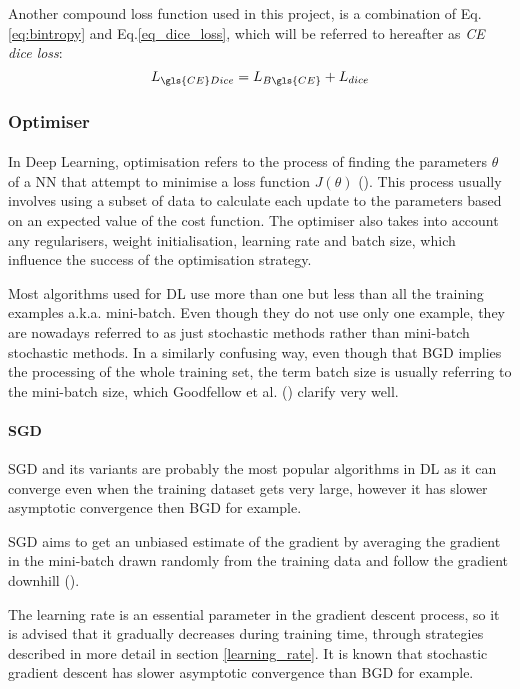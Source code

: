 Another compound loss function used in this project, is a combination of Eq.\ref{eq:bintropy} and Eq.\ref{eq_dice_loss}, which will be referred to hereafter as \textit{\gls{CE} dice loss}:
\begin{equation}
L_{\gls{CE} Dice} = L_{B\gls{CE}} + L_{dice}
\end{equation}
\subsubsection{Optimiser} \label{optimiser}
\paragraph{}
In Deep Learning, optimisation refers to the process of finding the parameters $\theta$ of a \gls{NN} that attempt to minimise a loss function $J(\theta)$ (\cite{GoodBengCour16}). This process usually involves using a subset of data to calculate each update to the parameters based on an expected value of the cost function. The optimiser also takes into account any regularisers, weight initialisation, learning rate and batch size, which influence the success of the optimisation strategy.

Most algorithms used for \gls{DL} use more than one but less than all the training examples \gls{a.k.a.} mini-batch. Even though they do not use only one example, they are nowadays referred to as just stochastic methods rather than mini-batch stochastic methods. In a similarly confusing way, even though that \gls{BGD} implies the processing of the whole training set, the term batch size is usually referring to the mini-batch size, which Goodfellow et al. (\cite{GoodBengCour16}) clarify very well.
\paragraph{\gls{SGD}}
\gls{SGD} and its variants are probably the most popular algorithms in \gls{DL} as it can converge even when the training dataset gets very large, however it has slower asymptotic convergence then \gls{BGD} for example.

\gls{SGD} aims to get an unbiased estimate of the gradient by averaging the gradient in the mini-batch drawn randomly from the training data and follow the gradient downhill (\cite{GoodBengCour16}).

The learning rate is an essential parameter in the gradient descent process, so it is advised that it gradually decreases during training time, through strategies described in more detail in section \ref{learning_rate}. It is known that stochastic gradient descent has slower asymptotic convergence than \gls{BGD} for example.

